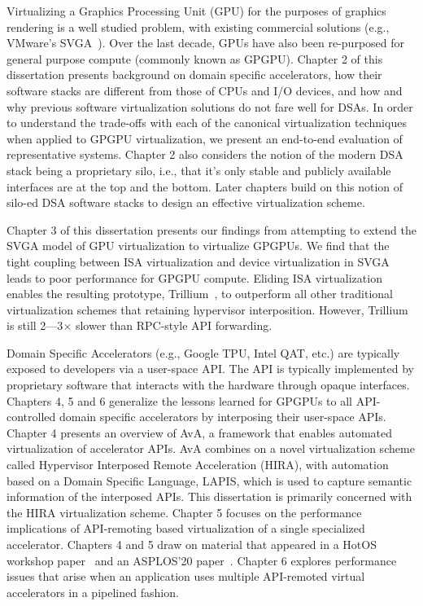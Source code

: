 Virtualizing a Graphics Processing Unit (GPU) for the purposes of graphics
rendering is a well studied problem, with existing commercial solutions (e.g.,
VMware’s SVGA~\cite{dowty2009gpu}). Over the last decade, GPUs have also been
re-purposed for general purpose compute (commonly known as GPGPU).
Chapter 2 of this dissertation presents background on domain specific
accelerators, how their software stacks are different from those of CPUs and
I/O devices, and how and why previous software virtualization solutions do not
fare well for DSAs. In order to understand the trade-offs with each of the
canonical virtualization techniques when applied to GPGPU virtualization, we
present an end-to-end evaluation of representative systems. Chapter 2 also
considers the notion of the modern DSA stack being a proprietary silo, i.e.,
that it's only stable and publicly available interfaces are at the top and the
bottom. Later chapters build on this notion of silo-ed DSA software stacks to
design an effective virtualization scheme.

Chapter 3 of this dissertation presents our findings from attempting to extend
the SVGA model of GPU virtualization to virtualize GPGPUs. We find that the
tight coupling between ISA virtualization and device  virtualization in SVGA
leads to poor performance for GPGPU compute. Eliding ISA virtualization
enables the resulting prototype, Trillium~\cite{trillium}, to outperform all
other traditional virtualization schemes that retaining hypervisor
interposition. However, Trillium is still 2---3$\times$ slower than RPC-style
API forwarding.

Domain Specific Accelerators (e.g., Google TPU, Intel QAT, etc.) are
typically exposed to developers via a user-space API. The API is typically
implemented by proprietary software that interacts with the hardware through
opaque interfaces.
Chapters 4, 5 and 6 generalize the lessons learned for GPGPUs to all
API-controlled domain specific accelerators by interposing their user-space
APIs.
Chapter 4 presents an overview of AvA, a framework that enables automated
virtualization of accelerator APIs. AvA combines on a novel virtualization
scheme called Hypervisor Interposed Remote Acceleration (HIRA), with
automation based on a Domain Specific Language, LAPIS, which is used to
capture semantic information of the interposed APIs. This dissertation is
primarily concerned with the HIRA virtualization scheme.
Chapter 5 focuses on the performance implications of API-remoting based
virtualization of a single specialized accelerator.
Chapters 4 and 5 draw on material that appeared in a HotOS workshop
paper~\cite{ava-hotos} and an ASPLOS'20 paper~\cite{ava-asplos}.
Chapter 6 explores performance issues that arise when an application uses
multiple API-remoted virtual accelerators in a pipelined fashion.

